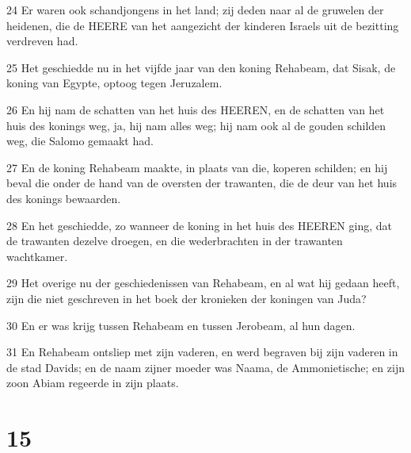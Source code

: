 \par 24 Er waren ook schandjongens in het land; zij deden naar al de gruwelen der heidenen, die de HEERE van het aangezicht der kinderen Israels uit de bezitting verdreven had.
\par 25 Het geschiedde nu in het vijfde jaar van den koning Rehabeam, dat Sisak, de koning van Egypte, optoog tegen Jeruzalem.
\par 26 En hij nam de schatten van het huis des HEEREN, en de schatten van het huis des konings weg, ja, hij nam alles weg; hij nam ook al de gouden schilden weg, die Salomo gemaakt had.
\par 27 En de koning Rehabeam maakte, in plaats van die, koperen schilden; en hij beval die onder de hand van de oversten der trawanten, die de deur van het huis des konings bewaarden.
\par 28 En het geschiedde, zo wanneer de koning in het huis des HEEREN ging, dat de trawanten dezelve droegen, en die wederbrachten in der trawanten wachtkamer.
\par 29 Het overige nu der geschiedenissen van Rehabeam, en al wat hij gedaan heeft, zijn die niet geschreven in het boek der kronieken der koningen van Juda?
\par 30 En er was krijg tussen Rehabeam en tussen Jerobeam, al hun dagen.
\par 31 En Rehabeam ontsliep met zijn vaderen, en werd begraven bij zijn vaderen in de stad Davids; en de naam zijner moeder was Naama, de Ammonietische; en zijn zoon Abiam regeerde in zijn plaats.

\chapter{15}

